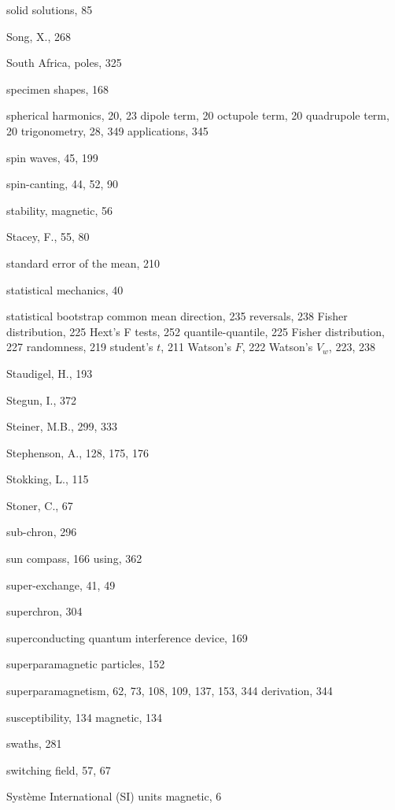 \documentclass[,plain]{tauxe}
\begin{document}
\begin{theindex}
  \item solid solutions, 85
  \item Song, X., 268
  \item South Africa, poles, 325
  \item specimen shapes, 168
  \item spherical
    \subitem harmonics, 20, 23
      \subsubitem dipole term, 20
      \subsubitem octupole term, 20
      \subsubitem quadrupole term, 20
    \subitem trigonometry, 28, 349
  \subsubitem  applications, 345
  \item spin waves, 45, 199
  \item spin-canting, 44, 52, 90
  \item stability, magnetic, 56
  \item Stacey, F., 55, 80
  \item standard error of the mean, 210
  \item statistical mechanics, 40
  \item statistical 
    \subitem bootstrap
      \subsubitem common mean direction, 235
      \subsubitem reversals, 238
    \subitem Fisher distribution, 225
    \subitem Hext's F tests, 252
    \subitem quantile-quantile, 225
      \subsubitem Fisher distribution, 227
    \subitem randomness, 219
    \subitem student's $t$, 211
    \subitem Watson's $F$, 222
    \subitem Watson's $V_w$, 223, 238
  \item Staudigel, H., 193
  \item Stegun, I., 372
  \item Steiner, M.B., 299, 333
  \item Stephenson, A., 128, 175, 176
  \item Stokking, L., 115
  \item Stoner, C., 67
  \item sub-chron, 296
  \item sun compass, 166
    \subitem using, 362
  \item super-exchange, 41, 49
  \item superchron, 304
  \item superconducting quantum interference device, 169
  \item superparamagnetic particles, 152
  \item superparamagnetism, 62, 73, 108, 109, 137, 153, 344
    \subitem derivation, 344
  \item susceptibility, 134
    \subitem magnetic, 134
  \item swaths, 281
\item switching field, 57, 67  
  \item Syst\` eme International (SI) units
    \subitem magnetic, 6


\end{theindex}
\end{document}
